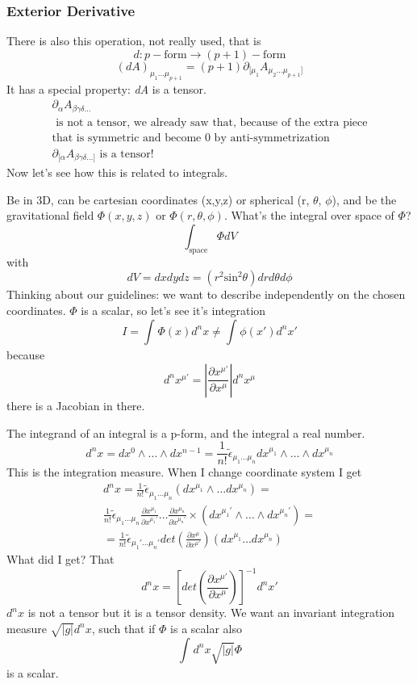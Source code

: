 \subsubsection{Exterior Derivative}
There is also this operation, not really used, that is
\[
	d : p-\text{form} \to \left( p+1 \right)-\text{form}
\]
\[
	\left( dA \right)_{\mu _{1}\ldots \mu _{p+1} } = \left( p+1 \right) \partial_{[\mu _{1}}A_{\mu _{2}\ldots \mu _{p+1}]}
\]
It has a special property: \emph{dA} is a tensor.
\begin{gather}
\partial_{\alpha }A_{\beta  \gamma  \delta \ldots }\\
\text{ is not a tensor, we already saw that, because of the extra piece}\\
\text{that is symmetric and become 0 by anti-symmetrization }\\
\partial_{[\alpha }A_{\beta  \gamma  \delta  \ldots ]} \text{ is a tensor! }
\end{gather}
Now let's see how this is related to integrals.\par
Be in 3D, can be cartesian coordinates (x,y,z) or spherical (r, $\theta $, $\phi $), and be the gravitational field $\Phi\left( x,y,z \right)$ or $\Phi \left( r,\theta ,\phi  \right)$. What's the integral over space of $\Phi $?
\[
	\int_{\text{space}}^{}{\Phi dV}
\]
with 
\[
	dV = dxdydz = \left( r^{2}\text{sin}^{2}\theta  \right)drd\theta d\phi 
\]
Thinking about our guidelines: we want to describe independently on the chosen coordinates. $\Phi $ is a scalar, so let's see it's integration
\[
I = \int_{}^{}{\Phi \left( x \right) d^{n}x} \neq \int_{}^{}{\phi \left( x' \right)d^{n}x'}
\]
because
\[
d^{n}x^{\mu '} = \left| \frac{\partial x^{\mu '}}{\partial x^{\mu }}\right| d^{n}x^{\mu }
\]
there is a Jacobian in there.\par
The integrand of an integral is a p-form, and the integral a real number.
\[
d^{n}x = dx^{0}\wedge \ldots  \wedge dx^{n-1} = \frac{1}{n!} \tilde{\epsilon }_{\mu_{1}\ldots \mu _{n}}dx^{\mu _{1}} \wedge \ldots \wedge dx^{\mu _{n}}
\]
This is the integration measure. When I change coordinate system I get
\begin{gather}
d^{n}x = \frac{1}{n!} \tilde{\epsilon}_{\mu_{1}\ldots \mu _{n}} \left( dx^{\mu _{1}} \wedge \ldots dx^{\mu _{n}} \right) =\\
\frac{1}{n!}\tilde{\epsilon }_{\mu _{1}\ldots \mu _{n}} \frac{\partial x^{\mu _{1}}}{\partial x^{\mu _{1}'}} \ldots \frac{\partial x^{\mu _{n}}}{\partial x^{\mu _{n}'}} \times \left( dx^{\mu _{1}'} \wedge \ldots \wedge dx^{\mu _{n}'} \right) = \\
= \frac{1}{n!} \tilde{\epsilon }_{\mu _{1}' \ldots \mu_{n}'} det\left( \frac{\partial x^{\mu }}{\partial x^{\mu '}}  \right)\left( dx^{\mu_{1}}\ldots dx^{\mu _{n}} \right)
\end{gather}
What did I get? That 
\[
	d^{n}x = \left[ det\left( \frac{\partial x^{\mu' }}{\partial x^{\mu }}  \right)\right]^{-1} d^{n}x'
\]
$d^{n}x$ is not a tensor but it is a tensor density.
We want an invariant integration measure $\sqrt{|g|}d^{n}x$, such that if $\Phi $ is a scalar also
\[
	\int_{}^{}{d^{n}x \sqrt{|g|}\Phi }
\]
is a scalar.\par

